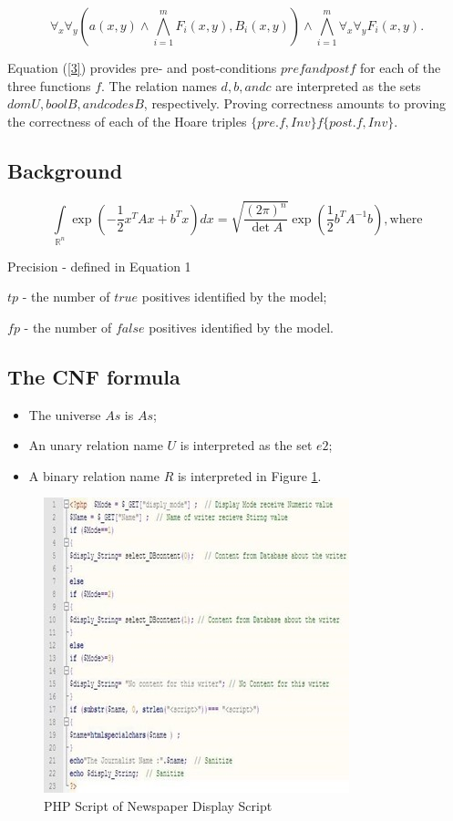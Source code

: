 \documentclass[12pt]{gji}
\begin{document}
\begin{equation}
    \forall_x \forall_y (a(x,y) \wedge \bigwedge_{i=1}^mF_i(x,y), B_i(x,y)) \wedge \bigwedge_{i=1}^m \forall_x \forall_y F_i(x,y).
    \label{2}
\end{equation}
 
 Equation (\ref{3}) provides pre- and post-conditions $pref and postf$ for each of the three functions $f$. The relation names $d, b, and c$ are interpreted as the sets $domU   , boolB, and codesB$, respectively. Proving correctness amounts to proving the correctness of each of the Hoare triples $\{pre.f, Inv\}  f  \{post.f, Inv\}$.

\subsection{Background}

\begin{equation}
    \int\limits_{\mathbb{R}^n} \exp\left( -\frac{1}{2} x^T A x + b^T x \right) dx = \sqrt{\frac{(2\pi)^n}{\det A}} \exp\left( \frac{1}{2} b^T A^{-1} b \right),
    \text{where}
    \label{3}
\end{equation}

Precision - defined in Equation 1\par
    $tp$ - the number of $true$ positives identified by the model;\par
	$fp$ - the number of $false$ positives identified by the model.

\subsection{The CNF formula}

\begin{itemize}
    \item The universe $As$ is $As$;
    \item An unary relation name $U$ is interpreted as the set $e2$;
    \item A binary relation name $R$ is interpreted in Figure \ref{pic2}.
\end{itemize}

\begin{figure}
    \centering
    \includegraphics{Picture2.jpg}
    \caption{PHP Script of Newspaper Display Script}
    \label{pic2}
\end{figure}
\end{document}
